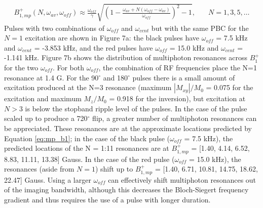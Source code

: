 \documentclass{article}
\begin{document}
\begin{equation}
\begin{array}{ll}
    B_{1,mp}^+(N,\omega_{av},\omega_{off}) \approx \frac{\omega_{off}}{\gamma} \sqrt{\left(1-\frac{\omega_{av}+ N(\omega_{off} - \omega_{av})}{\omega_{off}}\right)^2-1},  & \quad N = 1, 3, 5, \dots
    \end{array}
    \label{eq:mp_b1}
\end{equation}
Pulses with two combinations of $\omega_{off}$ and $\omega_{cent}$ 
but with the same PBC for the $N=1$ excitation are shown in Figure 7a: 
the black pulses have $\omega_{off}$ = 7.5 kHz and $\omega_{cent}$ = -3.853 kHz, 
and the red pulses have $\omega_{off}$ = 15.0 kHz and $\omega_{cent}$ = -1.141 kHz. 
Figure 7b shows the distribution of multiphoton resonances across $B_1^+$ for the two $\omega_{off}$.
For both $\omega_{off}$, the combination of RF frequencies place the N=1 resonance at 1.4 G. 
For the 90$^\circ$ and 180$^\circ$ pulses there is a small amount of excitation produced at the N=3 resonance (maximum $|M_{xy}|/M_0$ = 0.075 for the excitation and maximum $M_z/M_0$ = 0.918 for the inversion), 
but excitation at $N>3$ is below the stopband ripple level of the pulses.
In the case of the pulse scaled up to produce a 720$^\circ$ flip, 
a greater number of multiphoton resonances can be appreciated. 
These resonances are at the approximate locations predicted by Equation \ref{eq:mp_b1}; 
in the case of the black pulse ($\omega_{off}$ = 7.5 kHz), 
the predicted locations of the N = 1:11 resonances are at $B_{1,mp}^+$ = [1.40, 4.14, 6.52, 8.83, 11.11, 13.38] Gauss. 
In the case of the red pulse ($\omega_{off}$ = 15.0 kHz), 
the resonances (aside from $N=1$) shift up to $B_{1,mp}^+$ = [1.40, 6.71, 10.81, 14.75, 18.62, 22.47] Gauss. 
Using a larger $\omega_{off}$ can effectively shift multiphoton resonances out of the imaging bandwidth, 
although this decreases the Bloch-Siegert frequency gradient and thus requires the use of a pulse with longer duration. 
 
\end{document}
